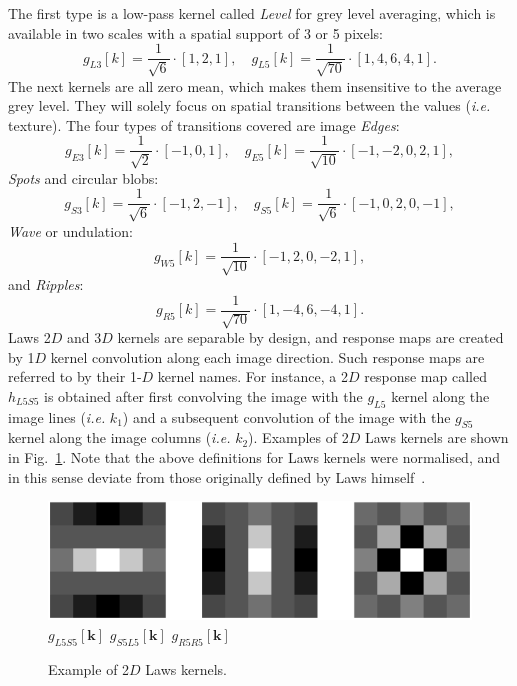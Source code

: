 \documentclass[fleqn,a4paper,oneside,openany]{book}
\begin{document}
The first type is a low-pass kernel called \emph{Level} for grey level averaging, which is available in two scales with a spatial support of 3 or 5 pixels:
$$g_{L3}[k] = \frac{1}{\sqrt{6}}\cdot\left[ 1,2,1 \right],\quad g_{L5}[k] = \frac{1}{\sqrt{70}}\cdot\left[ 1,4,6,4,1 \right].$$
The next kernels are all zero mean, which makes them insensitive to the average grey level. They will solely focus on spatial transitions between the values (\textit{i.e.} texture). The four types of transitions covered are image \emph{Edges}:
$$g_{E3}[k] = \frac{1}{\sqrt{2}}\cdot\left[-1, 0, 1 \right],\quad g_{E5}[k] = \frac{1}{\sqrt{10}}\cdot\left[-1, -2, 0, 2, 1 \right],$$
\emph{Spots} and circular blobs:
$$g_{S3}[k] = \frac{1}{\sqrt{6}}\cdot\left[-1, 2, -1 \right],\quad g_{S5}[k] = \frac{1}{\sqrt{6}}\cdot\left[-1, 0, 2, 0, -1 \right],$$
\emph{Wave} or undulation:
$$g_{W5}[k] = \frac{1}{\sqrt{10}}\cdot\left[-1, 2, 0, -2, 1 \right],$$
and \emph{Ripples}:
$$g_{R5}[k] = \frac{1}{\sqrt{70}}\cdot\left[ 1, -4, 6, -4, 1 \right].$$
Laws 2$D$ and 3$D$ kernels are separable by design, and response maps are created by 1$D$ kernel convolution along each image direction. Such response maps are referred to by their 1-$D$ kernel names. For instance, a 2$D$ response map called $h_{L5S5}$ is obtained after first convolving the image with the $g_{L5}$ kernel along the image lines (\textit{i.e.} $k_1$) and a subsequent convolution of the image with the $g_{S5}$ kernel along the image columns (\textit{i.e.} $k_2$).
Examples of 2$D$ Laws kernels are shown in Fig.~\ref{fig:Laws}.
%
Note that the above definitions for Laws kernels were normalised, and in this sense deviate from those originally defined by Laws himself~\cite{Law1980}.
%
\begin{figure}
\centering
\includegraphics[trim = 0 0 0 0, clip, scale=0.6]{Laws.png}\\
$g_{L5S5}[\boldsymbol{k}]$
\hspace{1.9cm}
$g_{S5L5}[\boldsymbol{k}]$
\hspace{1.9cm}
$g_{R5R5}[\boldsymbol{k}]$
\caption{Example of 2$D$ Laws kernels.}
  \label{fig:Laws}
\end{figure}
%
\end{document}
